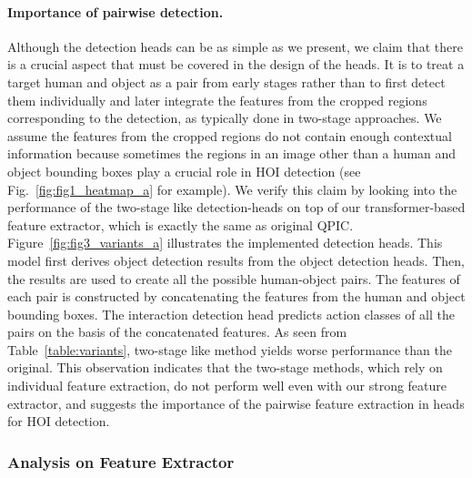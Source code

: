 \documentclass[final]{cvpr}
\begin{document}
\paragraph{Importance of pairwise detection.}
Although the detection heads can be as simple as we present, we claim that there is a crucial aspect that must be covered in the design of the heads. It is to treat a target human and object as a pair from early stages rather than to first detect them individually and later integrate the features from the cropped regions corresponding to the detection, as typically done in two-stage approaches.
We assume the features from the cropped regions do not contain enough contextual information because sometimes the regions in an image other than a human and object bounding boxes play a crucial role in HOI detection (see Fig.~\ref{fig:fig1_heatmap_a} for example). 
We verify this claim by looking into the performance of the two-stage like detection-heads on top of our transformer-based feature extractor, which is exactly the same as original QPIC.
Figure~\ref{fig:fig3_variants_a} illustrates the implemented detection heads. 
This model first derives object detection results from the object detection heads.
Then, the results are used to create all the possible human-object pairs.
The features of each pair is constructed by concatenating the features from the human and object bounding boxes.
The interaction detection head predicts action classes of all the pairs on the basis of the concatenated features.
As seen from Table~\ref{table:variants}, two-stage like method yields worse performance than the original. 
This observation indicates that the two-stage methods, which rely on individual feature extraction, do not perform well even with our strong feature extractor, and suggests the importance of the pairwise feature extraction in heads for HOI detection. 

\vspace{-2.0ex}

\subsubsection{Analysis on Feature Extractor}\label{subsec:feature_extractor}
\end{document}
